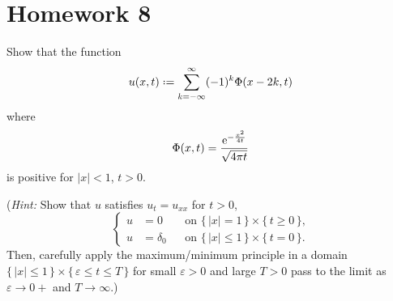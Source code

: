 \section{Homework 8}
\begin{problem}
  Show that the function
  \[
    u(x,t)\defeq\sum_{k=-\infty}^\infty (-1)^k\Phi(x-2k,t)
  \]
  where
  \[
    \Phi(x,t)=\frac{\mathrm{e}^{-\frac{x^2}{4t}}}{\sqrt{4\pi t}}
  \]
  is positive for \(|x|<1\), \(t>0\).

  \noindent (\emph{Hint:} Show that \(u\) satisfies \(u_t=u_{xx}\) for
  \(t>0\),
  \[
    \left\{
      \begin{aligned}
        u&=0&&\text{on \(\{\,|x|=1\,\}\times\{\,t\geq 0\,\}\),}\\
        u&=\delta_0&&\text{on \(\{\,|x|\leq 1\,\}\times\{\,t=0\,\}\).}
      \end{aligned}
    \right.
  \]
  Then, carefully apply the maximum/minimum principle in a domain
  \(\{\,|x|\leq 1\,\}\times\{\,\varepsilon\leq t\leq T\,\}\) for small
  \(\varepsilon>0\) and large \(T>0\) pass to the limit as
  \(\varepsilon\to 0+\) and \(T\to\infty\).)
\end{problem}
